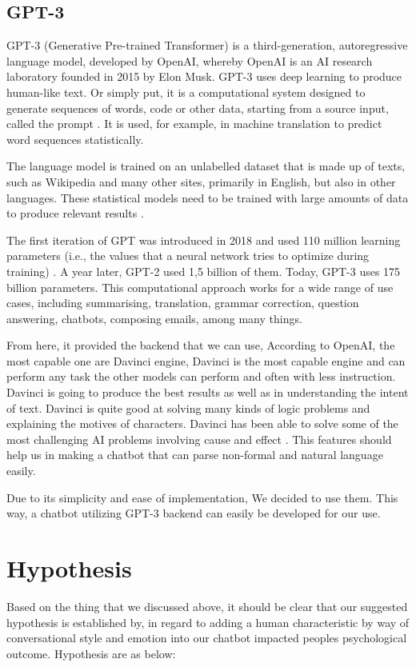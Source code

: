 \documentclass{vgtc}                          %
\begin{document}
\subsection{GPT-3}
GPT-3 (Generative Pre-trained Transformer) is a third-generation, autoregressive language model, developed by OpenAI, whereby OpenAI is an AI research laboratory founded in 2015 by Elon Musk. GPT-3 uses deep learning to produce human-like text. Or simply put, it is a computational system designed to generate sequences of words, code or other data, starting from a source input, called the prompt \cite{openai}. It is used, for example, in machine translation to predict word sequences statistically. 

The language model is trained on an unlabelled dataset that is made up of texts, such as Wikipedia and many other sites, primarily in English, but also in other languages. These statistical models need to be trained with large amounts of data to produce relevant results \cite{openai}. 

The first iteration of GPT was introduced in 2018 and used 110 million learning parameters (i.e., the values that a neural network tries to optimize during training) \cite{gpt3}. A year later, GPT-2 used 1,5 billion of them. Today, GPT-3 uses 175 billion parameters. This computational approach works for a wide range of use cases, including summarising, translation, grammar correction, question answering, chatbots, composing emails, among many things.

From here, it provided the backend that we can use, According to OpenAI, the most capable one are Davinci engine, Davinci is the most capable engine and can perform any task the other models can perform and often with less instruction. Davinci is going to produce the best results as well as in understanding the intent of text. Davinci is quite good at solving many kinds of logic problems and explaining the motives of characters. Davinci has been able to solve some of the most challenging AI problems involving cause and effect \cite{openai}\cite{gpt3}. This features should help us in making a chatbot that can parse non-formal and natural language easily.

Due to its simplicity and ease of implementation, We decided to use them. This way, a chatbot utilizing GPT-3 backend can easily be developed for our use.


\section{Hypothesis}
Based on the thing that we discussed above, it should be clear that our suggested hypothesis is established by, in regard to adding a human characteristic by way of conversational style and emotion into our chatbot impacted peoples psychological outcome. Hypothesis are as below:
\end{document}
